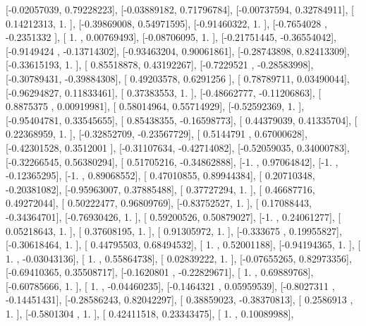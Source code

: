 \documentclass{article}
\begin{document}
       [-0.02057039,  0.79228223],
       [-0.03889182,  0.71796784],
       [-0.00737594,  0.32784911],
       [ 0.14212313,  1.        ],
       [-0.39869008,  0.54971595],
       [-0.91460322,  1.        ],
       [-0.7654028 , -0.2351332 ],
       [ 1.        ,  0.00769493],
       [-0.08706095,  1.        ],
       [-0.21751445, -0.36554042],
       [-0.9149424 , -0.13714302],
       [-0.93463204,  0.90061861],
       [-0.28743898,  0.82413309],
       [-0.33615193,  1.        ],
       [ 0.85518878,  0.43192267],
       [-0.7229521 , -0.28583998],
       [-0.30789431, -0.39884308],
       [ 0.49203578,  0.6291256 ],
       [ 0.78789711,  0.03490044],
       [-0.96294827,  0.11833461],
       [ 0.37383553,  1.        ],
       [-0.48662777, -0.11206863],
       [ 0.8875375 ,  0.00919981],
       [ 0.58014964,  0.55714929],
       [-0.52592369,  1.        ],
       [-0.95404781,  0.33545655],
       [ 0.85438355, -0.16598773],
       [ 0.44379039,  0.41335704],
       [ 0.22368959,  1.        ],
       [-0.32852709, -0.23567729],
       [ 0.5144791 ,  0.67000628],
       [-0.42301528,  0.3512001 ],
       [-0.31107634, -0.42714082],
       [-0.52059035,  0.34000783],
       [-0.32266545,  0.56380294],
       [ 0.51705216, -0.34862888],
       [-1.        ,  0.97064842],
       [-1.        , -0.12365295],
       [-1.        ,  0.89068552],
       [ 0.47010855,  0.89944384],
       [ 0.20710348, -0.20381082],
       [-0.95963007,  0.37885488],
       [ 0.37727294,  1.        ],
       [ 0.46687716,  0.49272044],
       [ 0.50222477,  0.96809769],
       [-0.83752527,  1.        ],
       [ 0.17088443, -0.34364701],
       [-0.76930426,  1.        ],
       [ 0.59200526,  0.50879027],
       [-1.        ,  0.24061277],
       [ 0.05218643,  1.        ],
       [ 0.37608195,  1.        ],
       [ 0.91305972,  1.        ],
       [-0.333675  ,  0.19955827],
       [-0.30618464,  1.        ],
       [ 0.44795503,  0.68494532],
       [ 1.        ,  0.52001188],
       [-0.94194365,  1.        ],
       [ 1.        , -0.03043136],
       [ 1.        ,  0.55864738],
       [ 0.02839222,  1.        ],
       [-0.07655265,  0.82973356],
       [-0.69410365,  0.35508717],
       [-0.1620801 , -0.22829671],
       [ 1.        ,  0.69889768],
       [-0.60785666,  1.        ],
       [ 1.        , -0.04460235],
       [-0.1464321 ,  0.05959539],
       [-0.8027311 , -0.14451431],
       [-0.28586243,  0.82042297],
       [ 0.38859023, -0.38370813],
       [ 0.2586913 ,  1.        ],
       [-0.5801304 ,  1.        ],
       [ 0.42411518,  0.23343475],
       [ 1.        ,  0.10089988],
\end{document}
